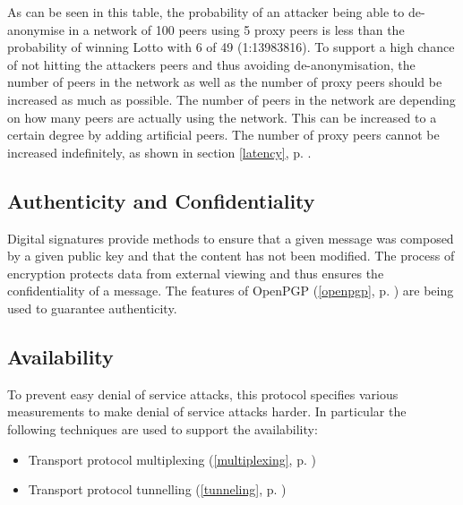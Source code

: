 As can be seen in this table, the probability of an attacker being able to
de-anonymise in a network of 100 peers using 5 proxy peers is less than
the probability of winning Lotto with 6 of 49 (1:13983816).
To support a high chance of not hitting the attackers peers and thus
avoiding de-anonymisation, the number of peers in the network as well 
as the number of proxy peers should be increased as much as possible. 
The number of peers in the network are
depending on how many peers are actually using the network. This can be
increased to a certain degree by adding artificial peers.
The number of proxy peers cannot be increased indefinitely, 
as shown in section \ref{latency}, p. \pageref{latency}.
\subsection{Authenticity and Confidentiality}
Digital signatures provide methods to ensure that a given message
was composed by a given public key and that the content has not been
modified. 
The process of encryption protects data from external
viewing and thus ensures the confidentiality of a message.
The features of OpenPGP (\ref{openpgp}, p. \pageref{openpgp})
are being used to guarantee authenticity.
\subsection{Availability}
To prevent easy denial of service attacks, this protocol specifies various
measurements to make denial of service attacks harder. In particular
the following techniques are used to support the availability:
\begin{itemize}
\item Transport protocol multiplexing (\ref{multiplexing}, p. \pageref{multiplexing})
\item Transport protocol tunnelling (\ref{tunneling}, p. \pageref{tunneling})
\end{itemize}
